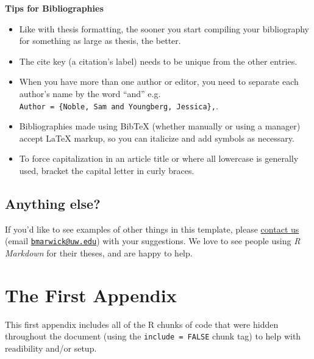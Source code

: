 \documentclass[twoside,12pt,final]{ucthesis-CA2012}
\providecommand{\tightlist}{%
  \setlength{\itemsep}{0pt}\setlength{\parskip}{0pt}}
\begin{document}
\begin{ucmainmatter}
\textbf{Tips for Bibliographies}
\begin{itemize}
\tightlist
\item
  Like with thesis formatting, the sooner you start compiling your
  bibliography for something as large as thesis, the better.
\item
  The cite key (a citation's label) needs to be unique from the other
  entries.
\item
  When you have more than one author or editor, you need to separate
  each author's name by the word ``and'' e.g.
  \texttt{Author\ =\ \{Noble,\ Sam\ and\ Youngberg,\ Jessica\},}.
\item
  Bibliographies made using BibTeX (whether manually or using a manager)
  accept LaTeX markup, so you can italicize and add symbols as
  necessary.
\item
  To force capitalization in an article title or where all lowercase is
  generally used, bracket the capital letter in curly braces.
\end{itemize}
\hypertarget{anything-else}{%
\section{Anything else?}\label{anything-else}}

If you'd like to see examples of other things in this template, please
\href{https://github.com/benmarwick/huskydown/issues/new}{contact us}
(email \href{mailto:bmarwick@uw.edu}{\nolinkurl{bmarwick@uw.edu}}) with
your suggestions. We love to see people using \emph{R Markdown} for
their theses, and are happy to help.

\appendix

\hypertarget{the-first-appendix}{%
\chapter{The First Appendix}\label{the-first-appendix}}

This first appendix includes all of the R chunks of code that were
hidden throughout the document (using the \texttt{include\ =\ FALSE}
chunk tag) to help with readibility and/or setup.


\end{ucmainmatter}
\end{document}
